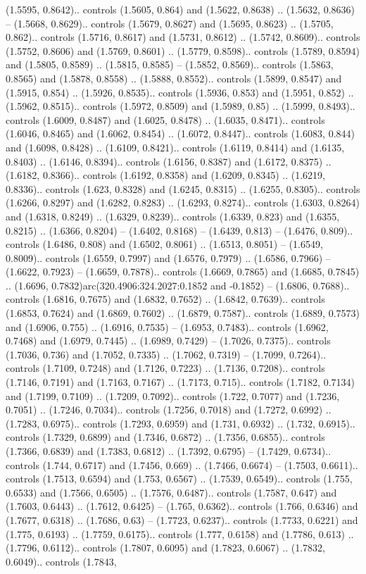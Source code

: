 (1.5595, 0.8642).. controls (1.5605, 0.864) and (1.5622, 0.8638) .. (1.5632, 0.8636) -- (1.5668, 0.8629).. controls (1.5679, 0.8627) and (1.5695, 0.8623) .. (1.5705, 0.862).. controls (1.5716, 0.8617) and (1.5731, 0.8612) .. (1.5742, 0.8609).. controls (1.5752, 0.8606) and (1.5769, 0.8601) .. (1.5779, 0.8598).. controls (1.5789, 0.8594) and (1.5805, 0.8589) .. (1.5815, 0.8585) -- (1.5852, 0.8569).. controls (1.5863, 0.8565) and (1.5878, 0.8558) .. (1.5888, 0.8552).. controls (1.5899, 0.8547) and (1.5915, 0.854) .. (1.5926, 0.8535).. controls (1.5936, 0.853) and (1.5951, 0.852) .. (1.5962, 0.8515).. controls (1.5972, 0.8509) and (1.5989, 0.85) .. (1.5999, 0.8493).. controls (1.6009, 0.8487) and (1.6025, 0.8478) .. (1.6035, 0.8471).. controls (1.6046, 0.8465) and (1.6062, 0.8454) .. (1.6072, 0.8447).. controls (1.6083, 0.844) and (1.6098, 0.8428) .. (1.6109, 0.8421).. controls (1.6119, 0.8414) and (1.6135, 0.8403) .. (1.6146, 0.8394).. controls (1.6156, 0.8387) and (1.6172, 0.8375) .. (1.6182, 0.8366).. controls (1.6192, 0.8358) and (1.6209, 0.8345) .. (1.6219, 0.8336).. controls (1.623, 0.8328) and (1.6245, 0.8315) .. (1.6255, 0.8305).. controls (1.6266, 0.8297) and (1.6282, 0.8283) .. (1.6293, 0.8274).. controls (1.6303, 0.8264) and (1.6318, 0.8249) .. (1.6329, 0.8239).. controls (1.6339, 0.823) and (1.6355, 0.8215) .. (1.6366, 0.8204) -- (1.6402, 0.8168) -- (1.6439, 0.813) -- (1.6476, 0.809).. controls (1.6486, 0.808) and (1.6502, 0.8061) .. (1.6513, 0.8051) -- (1.6549, 0.8009).. controls (1.6559, 0.7997) and (1.6576, 0.7979) .. (1.6586, 0.7966) -- (1.6622, 0.7923) -- (1.6659, 0.7878).. controls (1.6669, 0.7865) and (1.6685, 0.7845) .. (1.6696, 0.7832)arc(320.4906:324.2027:0.1852 and -0.1852) -- (1.6806, 0.7688).. controls (1.6816, 0.7675) and (1.6832, 0.7652) .. (1.6842, 0.7639).. controls (1.6853, 0.7624) and (1.6869, 0.7602) .. (1.6879, 0.7587).. controls (1.6889, 0.7573) and (1.6906, 0.755) .. (1.6916, 0.7535) -- (1.6953, 0.7483).. controls (1.6962, 0.7468) and (1.6979, 0.7445) .. (1.6989, 0.7429) -- (1.7026, 0.7375).. controls (1.7036, 0.736) and (1.7052, 0.7335) .. (1.7062, 0.7319) -- (1.7099, 0.7264).. controls (1.7109, 0.7248) and (1.7126, 0.7223) .. (1.7136, 0.7208).. controls (1.7146, 0.7191) and (1.7163, 0.7167) .. (1.7173, 0.715).. controls (1.7182, 0.7134) and (1.7199, 0.7109) .. (1.7209, 0.7092).. controls (1.722, 0.7077) and (1.7236, 0.7051) .. (1.7246, 0.7034).. controls (1.7256, 0.7018) and (1.7272, 0.6992) .. (1.7283, 0.6975).. controls (1.7293, 0.6959) and (1.731, 0.6932) .. (1.732, 0.6915).. controls (1.7329, 0.6899) and (1.7346, 0.6872) .. (1.7356, 0.6855).. controls (1.7366, 0.6839) and (1.7383, 0.6812) .. (1.7392, 0.6795) -- (1.7429, 0.6734).. controls (1.744, 0.6717) and (1.7456, 0.669) .. (1.7466, 0.6674) -- (1.7503, 0.6611).. controls (1.7513, 0.6594) and (1.753, 0.6567) .. (1.7539, 0.6549).. controls (1.755, 0.6533) and (1.7566, 0.6505) .. (1.7576, 0.6487).. controls (1.7587, 0.647) and (1.7603, 0.6443) .. (1.7612, 0.6425) -- (1.765, 0.6362).. controls (1.766, 0.6346) and (1.7677, 0.6318) .. (1.7686, 0.63) -- (1.7723, 0.6237).. controls (1.7733, 0.6221) and (1.775, 0.6193) .. (1.7759, 0.6175).. controls (1.777, 0.6158) and (1.7786, 0.613) .. (1.7796, 0.6112).. controls (1.7807, 0.6095) and (1.7823, 0.6067) .. (1.7832, 0.6049).. controls (1.7843, 